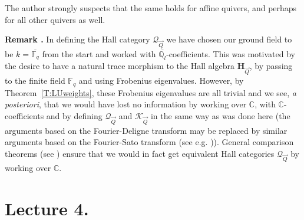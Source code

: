 \documentclass[a4paper,10pt]{amsart}
\def\H{\mathbf{H}}
\def\qlb{\overline{\mathbb{Q}_l}}
\def\C{\mathbb{C}}
\def\fqb{\overline{\mathbb{F}_q}}
\def\fq{\mathbb{F}_q}
\def\QQ{\mathcal{Q}_{\vec{Q}}}
\def\KQ{\mathcal{K}_{\vec{Q}}}
\numberwithin{equation}{section}
\begin{document}
\vspace{.1in}

The author strongly suspects that the same holds for affine quivers, and perhaps for all other quivers as well.

\vspace{.2in}

\addtocounter{theo}{1}
\noindent \textbf{Remark \thetheo .} In defining the Hall category $\QQ$ we have chosen our ground field to be $k=\fqb$ from the start and worked with $\qlb$-coefficients. This was motivated by the desire to have a natural trace morphism to the Hall algebra $\H_{\vec{Q}}$, by passing to the finite field $\fq$ and using Frobenius eigenvalues. However, by Theorem~\ref{T:LUweights}, these Frobenius eigenvalues are all trivial and we see, \textit{a posteriori}, that we would have lost no information by working over $\C$, with $\C$-coefficients and by defining $\QQ$ and $\KQ$ in the same way as was done here (the arguments based on the Fourier-Deligne transform may be replaced by similar arguments based on the Fourier-Sato transform (see e.g. \cite{KasShap})). General comparison theorems (see \cite{BBD}) ensure that we would in fact get equivalent Hall categories $\QQ$ by working over $\C$.

\newpage

\section{Lecture 4.}

\setcounter{section}{4}
\setcounter{theo}{0}
\setcounter{equation}{0}

\vspace{.2in}
\end{document}
